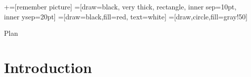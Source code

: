 \usetikzlibrary{positioning}
\usetikzlibrary{snakes}
\usetikzlibrary{calc}
\usetikzlibrary{arrows}
\usetikzlibrary{decorations.markings}
\usetikzlibrary{shapes.misc}
\usetikzlibrary{matrix,shapes,arrows,fit,tikzmark}
\usetikzlibrary{shapes}
\newcommand\marktopleft[1]{%
    \tikz[overlay,remember picture] 
        \node (marker-#1-a) at (-.3em,.3em) {};%
}
\newcommand\markbottomright[2]{%
    \tikz[overlay,remember picture] 
        \node (marker-#1-b) at (0em,0em) {};%
}
+=[remember picture] 
 =[draw=black, very thick, rectangle, inner sep=10pt, inner ysep=20pt]
 =[draw=black,fill=red, text=white]
=[draw,circle,fill=gray!50]



\begin{frame}
\titlepage
\end{frame}
\begin{frame}{Plan}
 \tableofcontents
    \end{frame}



\section{Introduction}
\frame{\sectionpage}

